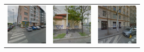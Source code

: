 \documentclass[border={5pt 1pt 5pt 5pt}, varwidth=38em]{standalone}
\begin{document}
{\begin{table}[ht]
\begin{tabular}{ccc}
\includegraphics[width=20mm]{imgs_for_table/original/0016_4.jpg} & \includegraphics[width=20mm]{imgs_for_table/original/0018_1.jpg} & \includegraphics[width=20mm]{imgs_for_table/original/0031_4.jpg}\\
\end{tabular}
\end{table}

}
\end{document}
